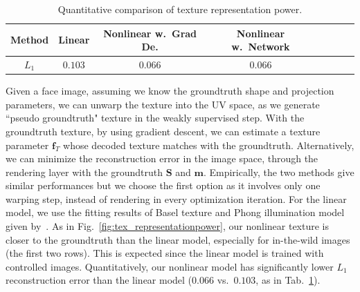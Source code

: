 \begin{table}[t!]
\footnotesize
\caption{\small{Quantitative comparison of texture representation power.}} 
\label{tab:tex_representation_tab}
\vspace{-6mm}
\begin{center}
\begin{tabular}{ cccccccc}
\toprule 
Method & Linear & Nonlinear w.~Grad De. & Nonlinear w.~Network \\ \midrule
$L_1$    & $0.103$ & $0.066$   & $0.066$ \\ 
\bottomrule
\end{tabular}
\end{center}
\figvspace\vspace{-2mm}
\end{table}

Given a face image, assuming we know the groundtruth shape and projection parameters, we can unwarp the texture into the UV space, as we generate ``pseudo groundtruth" texture in the weakly supervised step. 
With the groundtruth texture, by using gradient descent, we can estimate a texture parameter  $\mathbf{f}_T$ whose decoded texture matches with the groundtruth. 
Alternatively, we can minimize the reconstruction error in the image space, through the rendering layer with the groundtruth $\mathbf{S}$ and $\mathbf{m}$. 
Empirically, the two methods give similar performances but we choose the first option as it involves only one warping step, instead of rendering in every optimization iteration.
For the linear model, we use the fitting results of Basel texture and Phong illumination model~\cite{phong1975illumination} given by~\cite{zhu2016face}. 
As in Fig.~\ref{fig:tex_representationpower}, our nonlinear texture is closer to the groundtruth than the linear model, especially for in-the-wild images (the first two rows).
This is expected since the linear model is trained with controlled images. 
Quantitatively, our nonlinear model has significantly lower $L_1$ reconstruction error than the linear model ($0.066$ vs.~$0.103$, as in Tab.~\ref{tab:tex_representation_tab}).


